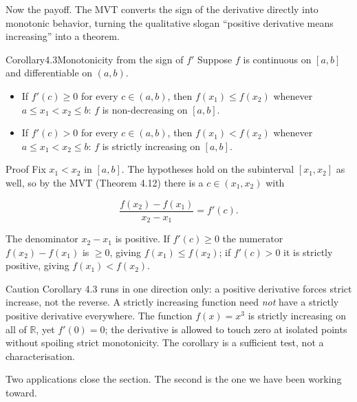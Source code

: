 \documentclass[a4paper,12pt,oneside]{memoir}
\begin{document}
Now the payoff. The MVT converts the sign of the derivative directly into monotonic behavior, turning the qualitative slogan “positive derivative means increasing” into a theorem.

\begin{envcorollary}{Corollary}{4.3}{Monotonicity from the sign of \(f'\)}
Suppose \(f\) is continuous on \([a, b]\) and differentiable on \((a, b)\).

\begin{itemize}
  \item If \(f'(c) \ge 0\) for every \(c \in (a, b)\), then \(f(x_{1}) \le f(x_{2})\) whenever \(a \le x_{1} < x_{2} \le b\): \(f\) is non-decreasing on \([a, b]\).
  \item If \(f'(c) > 0\) for every \(c \in (a, b)\), then \(f(x_{1}) < f(x_{2})\) whenever \(a \le x_{1} < x_{2} \le b\): \(f\) is strictly increasing on \([a, b]\).
\end{itemize}
\end{envcorollary}
\begin{envproof}{Proof}{}{}
Fix \(x_{1} < x_{2}\) in \([a, b]\). The hypotheses hold on the subinterval \([x_{1}, x_{2}]\) as well, so by the MVT (Theorem 4.12) there is a \(c \in (x_{1}, x_{2})\) with

\[ \frac{f(x_{2}) - f(x_{1})}{x_{2} - x_{1}} = f'(c). \]

The denominator \(x_{2} - x_{1}\) is positive. If \(f'(c) \ge 0\) the numerator \(f(x_{2}) - f(x_{1})\) is \(\ge 0\), giving \(f(x_{1}) \le f(x_{2})\); if \(f'(c) > 0\) it is strictly positive, giving \(f(x_{1}) < f(x_{2})\). \qedmark
\end{envproof}
\begin{envcaution}{Caution}{}{}
Corollary 4.3 runs in one direction only: a positive derivative forces strict increase, not the reverse. A strictly increasing function need \emph{not} have a strictly positive derivative everywhere. The function \(f(x) = x^{3}\) is strictly increasing on all of \(\mathbb{R}\), yet \(f'(0) = 0\); the derivative is allowed to touch zero at isolated points without spoiling strict monotonicity. The corollary is a sufficient test, not a characterisation.
\end{envcaution}
Two applications close the section. The second is the one we have been working toward.
\end{document}
